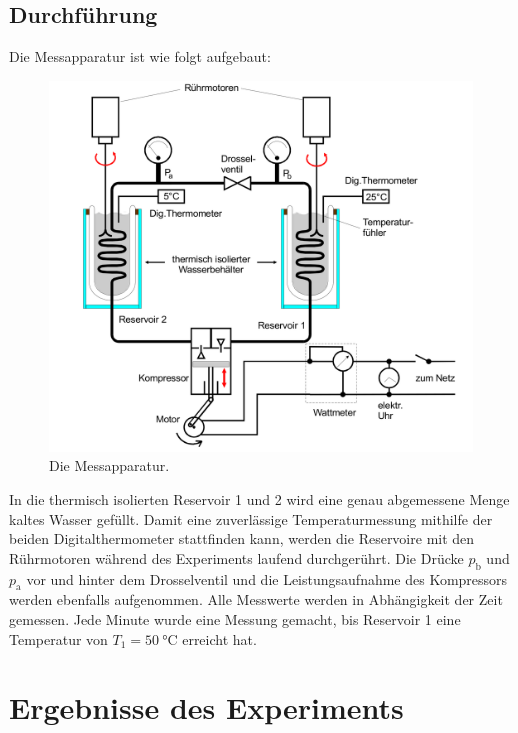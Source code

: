 \documentclass{scrartcl} %
\begin{document}
    \subsection{Durchführung}
      Die Messapparatur ist wie folgt aufgebaut:
      \begin{figure}
        \centering
        \includegraphics[scale = 0.15]{AufbauMessreihe.png}
        \caption{Die Messapparatur.}
        \label{fig:wärmepumpe2}
      \end{figure}
      In die thermisch isolierten Reservoir 1 und 2 wird eine genau abgemessene Menge kaltes Wasser gefüllt. Damit eine zuverlässige Temperaturmessung mithilfe der beiden
      Digitalthermometer stattfinden kann, werden die Reservoire mit den Rührmotoren während des Experiments laufend durchgerührt. Die Drücke $p_\text{b}$ und $p_\text{a}$
      vor und hinter dem Drosselventil und die Leistungsaufnahme des Kompressors werden ebenfalls aufgenommen. Alle Messwerte werden in Abhängigkeit der Zeit gemessen.
      Jede Minute wurde eine Messung gemacht, bis Reservoir 1 eine Temperatur von $T_\text{1} = \SI{50}{\celsius}$ erreicht hat.
\section{Ergebnisse des Experiments}
\end{document}
